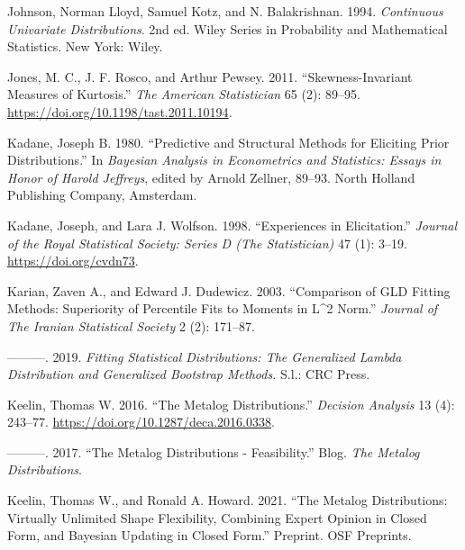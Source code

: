 \documentclass[
]{interact}
\newlength{\cslhangindent}
\newenvironment{CSLReferences}[2] %
 {\begin{list}{}{%
  \setlength{\itemindent}{0pt}
  \setlength{\leftmargin}{0pt}
  \setlength{\parsep}{0pt}
  \ifodd #1
   \setlength{\leftmargin}{\cslhangindent}
   \setlength{\itemindent}{-1\cslhangindent}
  \fi
  \setlength{\itemsep}{#2\baselineskip}}}
 {\end{list}}
\begin{document}
\begin{CSLReferences}{1}{0}
Johnson, Norman Lloyd, Samuel Kotz, and N. Balakrishnan. 1994.
\emph{Continuous Univariate Distributions}. 2nd ed. Wiley Series in
Probability and Mathematical Statistics. New York: Wiley.

Jones, M. C., J. F. Rosco, and Arthur Pewsey. 2011.
{``Skewness-{Invariant Measures} of {Kurtosis}.''} \emph{The American
Statistician} 65 (2): 89--95.
\url{https://doi.org/10.1198/tast.2011.10194}.

Kadane, Joseph B. 1980. {``Predictive and Structural Methods for
Eliciting Prior Distributions.''} In \emph{Bayesian {Analysis} in
{Econometrics} and {Statistics}: {Essays} in Honor of {Harold
Jeffreys}}, edited by Arnold Zellner, 89--93. North Holland Publishing
Company, Amsterdam.

Kadane, Joseph, and Lara J. Wolfson. 1998. {``Experiences in
Elicitation.''} \emph{Journal of the Royal Statistical Society: Series D
(The Statistician)} 47 (1): 3--19. \url{https://doi.org/cvdn73}.

Karian, Zaven A., and Edward J. Dudewicz. 2003. {``Comparison of {GLD
Fitting Methods}: {Superiority} of {Percentile Fits} to {Moments} in
{L}{\^{}}2 {Norm}.''} \emph{Journal of The Iranian Statistical Society}
2 (2): 171--87.

---------. 2019. \emph{Fitting {Statistical Distributions}: The
Generalized Lambda Distribution and Generalized Bootstrap Methods.}
S.l.: CRC Press.

Keelin, Thomas W. 2016. {``The {Metalog Distributions}.''}
\emph{Decision Analysis} 13 (4): 243--77.
\url{https://doi.org/10.1287/deca.2016.0338}.

---------. 2017. {``The {Metalog Distributions} - {Feasibility}.''}
Blog. \emph{The Metalog Distributions}.

Keelin, Thomas W., and Ronald A. Howard. 2021. {``The {Metalog
Distributions}: {Virtually Unlimited Shape Flexibility}, {Combining
Expert Opinion} in {Closed Form}, and {Bayesian Updating} in {Closed
Form}.''} Preprint. OSF Preprints.


\end{CSLReferences}
\end{document}
